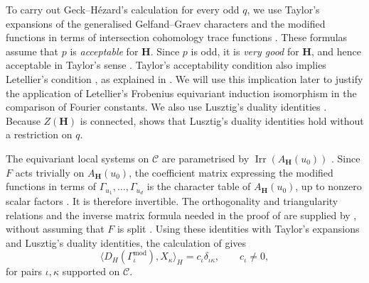 \documentclass[10pt]{amsart}
\theoremstyle{definition}
\let\oldendproof\endproof
\renewenvironment{proof}[1][\proofname]{%
  \oldproof[\bfseries #1]%
}{\oldendproof}
\DeclareMathOperator{\Irr}{Irr}
\numberwithin{equation}{section}
\numberwithin{table}{section}
\begin{document}
\begin{proof}[Proof of Lemma~\ref{lem:type-b-isolated-coverage}]
To carry out Geck--H\'ezard's calculation for every odd $q$, we use
Taylor's expansions of the generalised Gelfand--Graev characters and the
modified functions in terms of intersection cohomology trace functions
\cite[Theorem~11.13 and Lemma~11.16]{Taylor2016}. These formulas assume
that $p$ is \emph{acceptable} for $\mathbf H$. Since $p$ is odd, it is
\emph{very good} for $\mathbf H$, and hence acceptable in Taylor's sense
\cite[Definition~6.1 and Lemma~6.3(i)]{Taylor2016}.
Taylor's acceptability condition also implies Letellier's condition
\cite[Assumption~5.0.14]{Letellier2005}, as explained in
\cite[6.2]{Taylor2016}.
We will use this implication later to justify the application of
Letellier's Frobenius equivariant induction isomorphism
\cite[(6.2.11)]{Letellier2005} in the comparison of Fourier constants.
We also use Lusztig's duality identities
\cite[Proposition~8.5 and Corollary~8.6]{Lusztig1992Support}.
Because $Z(\mathbf H)$ is connected, \cite[Corollary~13.6]{Taylor2016}
shows that Lusztig's duality identities hold without a restriction on $q$.

The equivariant local systems on $\mathcal C$ are parametrised by
$\Irr(A_{\mathbf H}(u_0))$ \cite[(4.2)]{Geck1999GGGR}.
Since $F$ acts trivially on $A_{\mathbf H}(u_0)$, the coefficient matrix
expressing the modified functions in terms of
$\Gamma_{u_1},\ldots,\Gamma_{u_d}$ is the character table of
$A_{\mathbf H}(u_0)$, up to nonzero scalar factors
\cite[Section~3(A)]{GeckMalle2000}. It is therefore invertible.
The orthogonality and triangularity relations and the inverse matrix
formula needed in the proof of \cite[Lemma~3.5]{Geck1994BasicIII} are
supplied by \cite[Lemma~10.9, (10.11), Theorem~10.14 and (10.20)]{Taylor2016},
without assuming that $F$ is split \cite[10.1]{Taylor2016}.
Using these identities with Taylor's expansions and Lusztig's duality
identities, the calculation of \cite[Lemma~3.5]{Geck1994BasicIII} gives
\begin{equation}\label{eq:gggr-dual-pairing}
 \bigl\langle D_H(\Gamma_\iota^{\mathrm{mod}}),X_\kappa\bigr\rangle_H
 =c_\iota\delta_{\iota\kappa},\qquad c_\iota\ne0,
\end{equation}
for pairs $\iota,\kappa$ supported on $\mathcal C$.


\end{proof}
\end{document}

